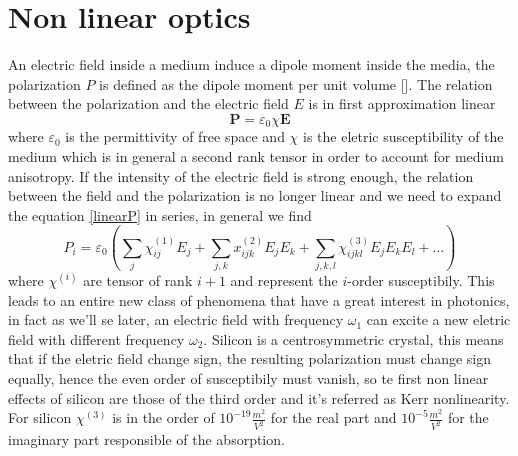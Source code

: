 \documentclass[12pt]{book}
\begin{document}
\section{Non linear optics}
An electric field inside a medium induce a dipole moment inside the media, the polarization $P$ is defined as the dipole moment per unit volume []. The relation between the polarization and the electric field $E$ is in first approximation linear
\begin{equation}\label{linearP} \mathbf{P} = \varepsilon_0 \chi \mathbf{E}
\end{equation}
where $\varepsilon_0$ is the permittivity of free space and $\chi$ is the eletric susceptibility of the medium which is in general a second rank tensor in order to account for medium anisotropy. If the intensity of the electric field is strong enough, the relation between the field and the polarization is no longer linear and we need to expand the equation \eqref{linearP} in series, in general we find
\[P_i  = \varepsilon_0(\sum_j \chi_{ij}^{(1)} E_j + \sum_{j,k}x_{ijk}^{(2)}E_jE_k + \sum_{j,k,l}\chi_{ijkl}^{(3)}E_jE_kE_l + \dots )\]
where $\chi^{(i)}$ are tensor of rank $i+1$ and represent the $i$-order susceptibily. This leads to an entire new class of phenomena that have a great interest in photonics, in fact as we'll se later, an electric field with frequency $\omega_1$ can excite a new eletric field with different frequency $\omega_2$. Silicon is a centrosymmetric crystal, this means that if the eletric field change sign, the resulting polarization must change sign equally, hence the even order of susceptibily must vanish, so te first non linear effects of silicon are those of the third order and it's referred as Kerr nonlinearity. For silicon $\chi^{(3)}$ is in the order of $10^{-19} \frac{m^2}{V^2}$ for the real part and $10^{-5} \frac{m^2}{V^2}$ for the imaginary part responsible of the absorption.
\end{document}

